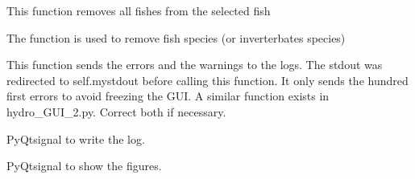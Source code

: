 \documentclass[letterpaper,10pt,english]{sphinxmanual}
\begin{document}
\begin{fulllineitems}
\begin{fulllineitems}
\end{fulllineitems}


\begin{fulllineitems}
\label{\detokenize{index:src_GUI.estimhab_GUI.StatModUseful.remove_all_fish}}
This function removes all fishes from the selected fish

\end{fulllineitems}


\begin{fulllineitems}
\label{\detokenize{index:src_GUI.estimhab_GUI.StatModUseful.remove_fish}}
The function is used to remove fish species (or inverterbates species)

\end{fulllineitems}


\begin{fulllineitems}
\label{\detokenize{index:src_GUI.estimhab_GUI.StatModUseful.send_err_log}}
This function sends the errors and the warnings to the logs.
The stdout was redirected to self.mystdout before calling this function. It only sends the hundred first errors
to avoid freezing the GUI. A similar function exists in hydro\_GUI\_2.py. Correct both if necessary.

\end{fulllineitems}


\begin{fulllineitems}
\label{\detokenize{index:src_GUI.estimhab_GUI.StatModUseful.send_log}}
PyQtsignal to write the log.

\end{fulllineitems}


\begin{fulllineitems}
\label{\detokenize{index:src_GUI.estimhab_GUI.StatModUseful.show_fig}}
PyQtsignal to show the figures.

\end{fulllineitems}


\end{fulllineitems}
\end{document}
